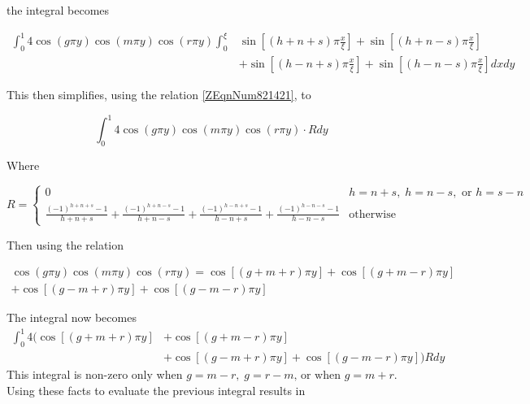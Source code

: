 \documentclass{article}
\newcommand{\spbox}[1]{ \text{ #1 }} %
\newcommand{\csp}{, \;} %
\newcommand{\cfunc}[5]{
    #1 = 
    \begin{cases} 
        #2 & #3 \\
        #4 & #5
    \end{cases}
}
\begin{document}
the integral becomes

\begin{equation*} \begin{split}
    \int _{0}^{1} 4 \cos \left(g \pi y\right) \cos \left(m \pi y\right)
    \cos \left(r \pi y\right) \int _{0}^{\xi } 
    &\sin \left[\left(h + n + s\right) \pi \frac{x}{\xi } \right]
    +\sin \left[\left(h+n-s\right)\pi \frac{x}{\xi } \right] \\ 
    & + \sin \left[\left(h - n + s\right)\pi \frac{x}{\xi } \right] 
    + \sin \left[\left(h - n - s\right)\pi \frac{x}{\xi } \right] dxdy 
\end{split} \end{equation*}

This then simplifies, using the relation \eqref{ZEqnNum821421}, to

\begin{equation*}
    \int _{0}^{1} 4\cos \left(g\pi y\right) 
    \cos \left(m\pi y\right)\cos \left(r \pi y\right)\cdot R dy 
\end{equation*}

Where

\begin{equation} \label{ZEqnNum244131} 
    \cfunc{R}
    {0}{h = n + s \csp h = n - s, \spbox{or} h = s - n}
    {\frac{\left(-1\right)^{h + n + s} - 1}{h + n + s} 
        + \frac{\left(-1\right)^{h + n - s} - 1}{h + n - s}
        + \frac{\left(-1\right)^{h - n + s} - 1}{h - n + s} 
        + \frac{\left(-1\right)^{h - n - s} - 1}{h - n - s}} 
    {\text{otherwise}}
\end{equation}

Then using the relation

\begin{equation*}
    \begin{array}{l} {\cos \left(g\pi y\right)\cos \left(m\pi y\right)\cos
    \left(r\pi y\right)=\cos \left[\left(g+m+r\right)\pi y\right]+\cos
    \left[\left(g+m-r\right)\pi y\right]} \\ {+\cos \left[\left(g-m+r\right)\pi
    y\right]+\cos \left[\left(g-m-r\right)\pi y\right]} \end{array} 
\end{equation*}

The integral now becomes 
\begin{equation*} \begin{split}
    \int_{0}^{1} 4(\cos \left[\left(g + m + r\right) \pi y\right]
    & + \cos \left[\left(g + m - r\right)\pi y\right] \\
    & + \cos \left[\left(g - m + r\right)\pi y\right]
    + \cos \left[\left(g - m - r\right)\pi y\right] ) Rdy 
\end{split} \end{equation*}
This integral is non-zero only when $g = m - r \csp 
g = r - m \text{, or when } g = m + r$. Using these facts to evaluate the previous
integral results in
\end{document}
